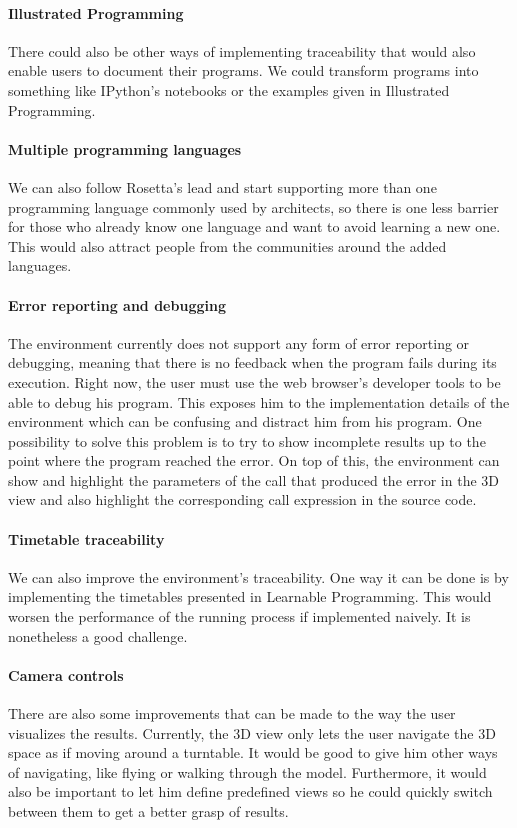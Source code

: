 \paragraph{Illustrated Programming}
There could also be other ways of implementing traceability that would also enable users to document their programs.
We could transform programs into something like IPython's notebooks or the examples given in Illustrated Programming\cite{Leitao2014illustrated}.

\paragraph{Multiple programming languages}
We can also follow Rosetta's lead and start supporting more than one programming language commonly used by architects, so there is one less barrier for those who already know one language and want to avoid learning a new one.
This would also attract people from the communities around the added languages.

\paragraph{Error reporting and debugging}
The environment currently does not support any form of error reporting or debugging, meaning that there is no feedback when the program fails during its execution.
Right now, the user must use the web browser's developer tools to be able to debug his program.
This exposes him to the implementation details of the environment which can be confusing and distract him from his program.
One possibility to solve this problem is to try to show incomplete results up to the point where the program reached the error.
On top of this, the environment can show and highlight the parameters of the call that produced the error in the 3D view and also highlight the corresponding call expression in the source code.

\paragraph{Timetable traceability}
We can also improve the environment's traceability.
One way it can be done is by implementing the timetables presented in Learnable Programming\cite{victor2012learnable}.
This would worsen the performance of the running process if implemented naively.
It is nonetheless a good challenge.

\paragraph{Camera controls}
There are also some improvements that can be made to the way the user visualizes the results.
Currently, the 3D view only lets the user navigate the 3D space as if moving around a turntable.
It would be good to give him other ways of navigating, like flying or walking through the model.
Furthermore, it would also be important to let him define predefined views so he could quickly switch between them to get a better grasp of results.

